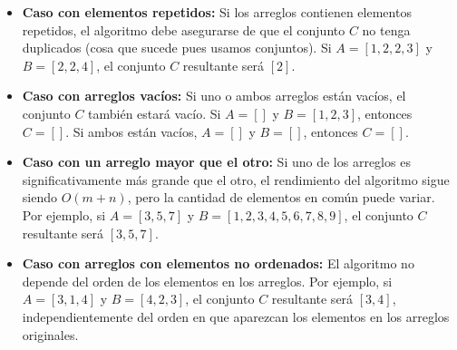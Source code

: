\documentclass[12pt]{article}
\begin{document}
\begin{itemize}
\begin{itemize}
        \item \textbf{Caso con elementos repetidos:} Si los arreglos contienen elementos repetidos, el algoritmo debe asegurarse de que el conjunto $C$ no tenga duplicados (cosa que sucede pues usamos conjuntos). Si $A = [1, 2, 2, 3]$ y $B = [2, 2, 4]$, el conjunto $C$ resultante será $[2]$.
        \item \textbf{Caso con arreglos vacíos:} Si uno o ambos arreglos están vacíos, el conjunto $C$ también estará vacío. Si $A = []$ y $B = [1, 2, 3]$, entonces $C = []$. Si ambos están vacíos, $A = []$ y $B = []$, entonces $C = []$.
        \item \textbf{Caso con un arreglo mayor que el otro:} Si uno de los arreglos es significativamente más grande que el otro, el rendimiento del algoritmo sigue siendo $O(m + n)$, pero la cantidad de elementos en común puede variar. Por ejemplo, si $A = [3, 5, 7]$ y $B = [1, 2, 3, 4, 5, 6, 7, 8, 9]$, el conjunto $C$ resultante será $[3, 5, 7]$.
        \item \textbf{Caso con arreglos con elementos no ordenados:} El algoritmo no depende del orden de los elementos en los arreglos. Por ejemplo, si $A = [3, 1, 4]$ y $B = [4, 2, 3]$, el conjunto $C$ resultante será $[3, 4]$, independientemente del orden en que aparezcan los elementos en los arreglos originales.
    \end{itemize}
\end{itemize}
\end{document}
